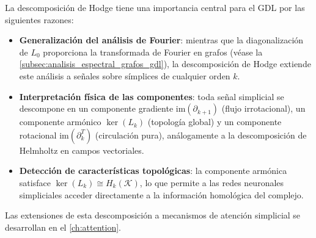 La descomposición de Hodge tiene una importancia central para el \gls{GDL} por las siguientes razones:
\begin{itemize}
	\item \textbf{Generalización del análisis de Fourier}: mientras que la diagonalización de $L_0$ proporciona la transformada de Fourier en grafos (véase la \autoref{subsec:analisis_espectral_grafos_gdl}), la descomposición de Hodge extiende este análisis a señales sobre símplices de cualquier orden $k$.
	\item \textbf{Interpretación física de las componentes}: toda señal simplicial se descompone en un componente gradiente $\mathrm{im}(\partial_{k+1})$ (flujo irrotacional), un componente armónico $\ker(L_k)$ (topología global) y un componente rotacional $\mathrm{im}(\partial_k^T)$ (circulación pura), análogamente a la descomposición de Helmholtz en campos vectoriales.
	\item \textbf{Detección de características topológicas}: la componente armónica satisface $\ker(L_k) \cong H_k(\mathcal{K})$, lo que permite a las redes neuronales simpliciales acceder directamente a la información homológica del complejo.
\end{itemize}
Las extensiones de esta descomposición a mecanismos de atención simplicial se desarrollan en el \autoref{ch:attention}.

